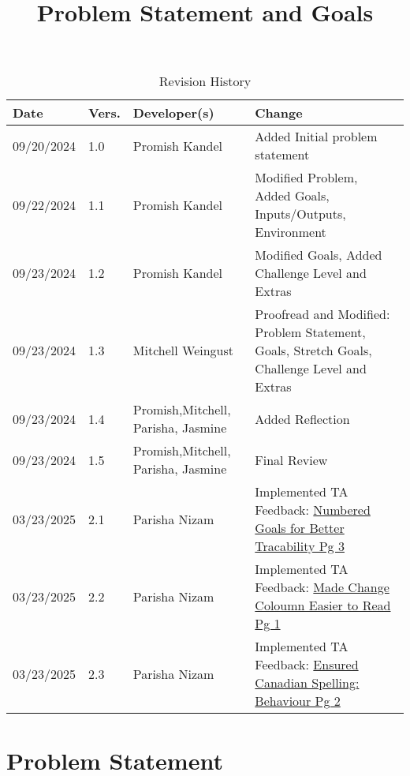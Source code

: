 \documentclass{article}
\title{Problem Statement and Goals\\\progname}
\author{\authname}
\date{}
\begin{document}
\maketitle


\begin{table}[hp]
    \caption{Revision History} \label{TblRevisionHistory}
    \begin{tabularx}{\textwidth}{p{1.5cm}p{1cm}p{3cm}X}
    \toprule {\textbf{Date}} & {\textbf{Vers.}} & {\textbf{Developer(s)}} & {\textbf{Change}}\\
    \midrule
    09/20/2024 & 1.0 & Promish Kandel & Added Initial problem statement\\
    09/22/2024 & 1.1 & Promish Kandel & Modified Problem, Added Goals, Inputs/Outputs, Environment\\
    09/23/2024 & 1.2 & Promish Kandel & Modified Goals, Added Challenge Level and Extras\\
    09/23/2024 & 1.3 & Mitchell Weingust & Proofread and Modified: Problem Statement, Goals, Stretch Goals, Challenge Level and Extras\\
    09/23/2024 & 1.4 & Promish,Mitchell, Parisha, Jasmine & Added Reflection \\
    09/23/2024 & 1.5 & Promish,Mitchell, Parisha, Jasmine & Final Review \\
    03/23/2025 & 2.1 & Parisha Nizam & Implemented TA Feedback: \href{https://github.com/parishanizam/TeleHealth/issues/181}{Numbered Goals for Better Tracability Pg 3} \\
    03/23/2025 & 2.2 & Parisha Nizam & Implemented TA Feedback: \href{https://github.com/parishanizam/TeleHealth/issues/182}{Made Change Coloumn Easier to Read Pg 1} \\
    03/23/2025 & 2.3 & Parisha Nizam & Implemented TA Feedback: \href{https://github.com/parishanizam/TeleHealth/issues/183}{Ensured Canadian Spelling: Behaviour Pg 2} \\
    \bottomrule
    \end{tabularx}
\end{table}

\section{Problem Statement}
\end{document}

